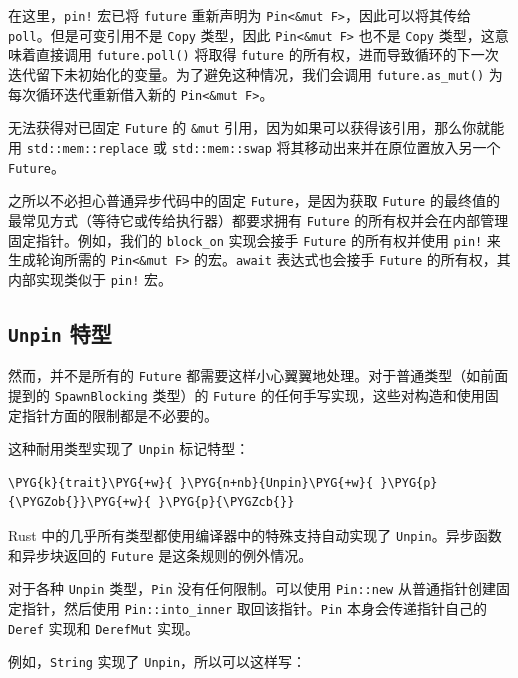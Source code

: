 在这里，\texttt{pin!} 宏已将 \texttt{future} 重新声明为 \texttt{Pin<\&mut F>}，因此可以将其传给 \texttt{poll}。但是可变引用不是 \texttt{Copy} 类型，因此 \texttt{Pin<\&mut F>} 也不是 \texttt{Copy} 类型，这意味着直接调用 \texttt{future.poll()} 将取得 \texttt{future} 的所有权，进而导致循环的下一次迭代留下未初始化的变量。为了避免这种情况，我们会调用 \texttt{future.as\_mut()} 为每次循环迭代重新借入新的 \texttt{Pin<\&mut F>}。

无法获得对已固定 \texttt{Future} 的 \texttt{\&mut} 引用，因为如果可以获得该引用，那么你就能用 \texttt{std::mem::replace} 或 \texttt{std::mem::swap} 将其移动出来并在原位置放入另一个 \texttt{Future}。

之所以不必担心普通异步代码中的固定 \texttt{Future}，是因为获取 \texttt{Future} 的最终值的最常见方式（等待它或传给执行器）都要求拥有 \texttt{Future} 的所有权并会在内部管理固定指针。例如，我们的 \texttt{block\_on} 实现会接手 \texttt{Future} 的所有权并使用 \texttt{pin!} 来生成轮询所需的 \texttt{Pin<\&mut F>} 的宏。\texttt{await} 表达式也会接手 \texttt{Future} 的所有权，其内部实现类似于 \texttt{pin!} 宏。

\subsection{\texttt{Unpin} 特型}

然而，并不是所有的 \texttt{Future} 都需要这样小心翼翼地处理。对于普通类型（如前面提到的 \texttt{SpawnBlocking} 类型）的 \texttt{Future} 的任何手写实现，这些对构造和使用固定指针方面的限制都是不必要的。

这种耐用类型实现了 \texttt{Unpin} 标记特型：

\begin{Verbatim}[commandchars=\\\{\},breaklines=true,breakanywhere=true,fontsize=\codefont,xleftmargin=17bp]
\PYG{k}{trait}\PYG{+w}{ }\PYG{n+nb}{Unpin}\PYG{+w}{ }\PYG{p}{\PYGZob{}}\PYG{+w}{ }\PYG{p}{\PYGZcb{}}
\end{Verbatim}

Rust 中的几乎所有类型都使用编译器中的特殊支持自动实现了 \texttt{Unpin}。异步函数和异步块返回的 \texttt{Future} 是这条规则的例外情况。

对于各种 \texttt{Unpin} 类型，\texttt{Pin} 没有任何限制。可以使用 \texttt{Pin::new} 从普通指针创建固定指针，然后使用 \texttt{Pin::into\_inner} 取回该指针。\texttt{Pin} 本身会传递指针自己的 \texttt{Deref} 实现和 \texttt{DerefMut} 实现。

例如，\texttt{String} 实现了 \texttt{Unpin}，所以可以这样写：

